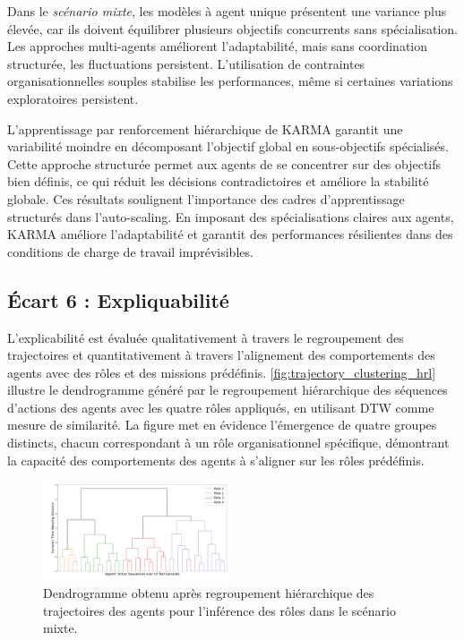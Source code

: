 Dans le \textit{scénario mixte}, les modèles à agent unique présentent une variance plus élevée, car ils doivent équilibrer plusieurs objectifs concurrents sans spécialisation. Les approches multi-agents améliorent l'adaptabilité, mais sans coordination structurée, les fluctuations persistent. L'utilisation de contraintes organisationnelles souples stabilise les performances, même si certaines variations exploratoires persistent.

L'apprentissage par renforcement hiérarchique de KARMA garantit une variabilité moindre en décomposant l'objectif global en sous-objectifs spécialisés. Cette approche structurée permet aux agents de se concentrer sur des objectifs bien définis, ce qui réduit les décisions contradictoires et améliore la stabilité globale.
%
Ces résultats soulignent l'importance des cadres d'apprentissage structurés dans l'auto-scaling. En imposant des spécialisations claires aux agents, KARMA améliore l'adaptabilité et garantit des performances résilientes dans des conditions de charge de travail imprévisibles.


\subsection{Écart 6 : Expliquabilité}
\label{subsec:gap_explainability}

L'explicabilité est évaluée qualitativement à travers le regroupement des trajectoires et quantitativement à travers l'alignement des comportements des agents avec des rôles et des missions prédéfinis.
\noindent \autoref{fig:trajectory_clustering_hrl} illustre le dendrogramme généré par le regroupement hiérarchique des séquences d'actions des agents avec les quatre rôles appliqués, en utilisant DTW comme mesure de similarité. La figure met en évidence l'émergence de quatre groupes distincts, chacun correspondant à un rôle organisationnel spécifique, démontrant la capacité des comportements des agents à s'aligner sur les rôles prédéfinis.

\begin{figure}[h!]
    \centering
    \includegraphics[width=0.49\textwidth]{figures/role_hierarchical_clustering.pdf}
    \caption{Dendrogramme obtenu après regroupement hiérarchique des trajectoires des agents pour l'inférence des rôles dans le scénario mixte.}
    \label{fig:trajectory_clustering_hrl}
\end{figure}

